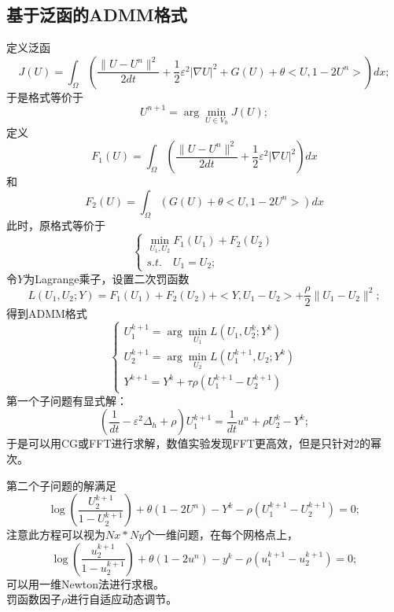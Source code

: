 \documentclass[11pt,a4 paper,one side]{article}
\begin{document}
\subsection{基于泛函的ADMM格式}
定义泛函\begin{equation}
    J(U) = \int_{\Omega} ( \frac{\|U-U^n\|^2}{2dt}+  \frac{1}{2}\varepsilon^2 |\nabla U|^2  + G(U)  + \theta <U,1-2U^n>) dx;
\end{equation} 
于是格式等价于\begin{equation}
    U^{n+1} = \arg \min_{U \in V_h} J(U);
\end{equation}
定义\begin{equation}
    F_1(U) = \int_{\Omega} (\frac{\|U-U^n\|^2}{2dt} +  \frac{1}{2}\varepsilon^2 |\nabla U|^2 )dx
\end{equation}
和\begin{equation}
    F_2(U) =  \int_{\Omega} (G(U)  + \theta <U,1-2U^n> ) dx
\end{equation}
此时，原格式等价于\begin{equation}
    \begin{cases}
    \min_{U_1,U_2} F_1(U_1) + F_2(U_2)\\
     s.t. \quad U_1=U_2;
    \end{cases}
\end{equation}
令$Y$为Lagrange乘子，设置二次罚函数\begin{equation}
    L(U_1,U_2;Y) = F_1(U_1) + F_2(U_2) + <Y,U_1-U_2> + \frac{\rho}{2}\|U_1-U_2\|^2;
\end{equation}
得到ADMM格式\begin{equation}
    \begin{cases}
        U_1^{k+1} = \arg \min_{U_1} L(U_1,U_2^k;Y^k) \\
        U_2^{k+1} = \arg \min_{U_2} L(U_1^{k+1},U_2;Y^k) \\
        Y^{k+1} = Y^k + \tau \rho (U_1^{k+1}-U_2^{k+1})
    \end{cases}
\end{equation}
第一个子问题有显式解：\begin{equation}
    (\frac{1}{dt}-\varepsilon^2 \Delta_h + \rho)U_1^{k+1} = \frac{1}{dt}u^n + \rho U_2^k - Y^k;
\end{equation}
于是可以用CG或FFT进行求解，数值实验发现FFT更高效，但是只针对2的幂次。
\par 第二个子问题的解满足\begin{equation}
    \log (\frac{U_2^{k+1}}{1-U_2^{k+1}})+\theta (1-2U^n) - Y^k -\rho (U_1^{k+1}-U_2^{k+1})=0;
\end{equation}
注意此方程可以视为$Nx*Ny$个一维问题，在每个网格点上，
\begin{equation}
    \log (\frac{u_2^{k+1}}{1-u_2^{k+1}})+\theta (1-2u^n) - y^k -\rho (u_1^{k+1}-u_2^{k+1})=0;
\end{equation}
可以用一维Newton法进行求根。
\\罚函数因子$\rho$进行自适应动态调节。
\end{document}
